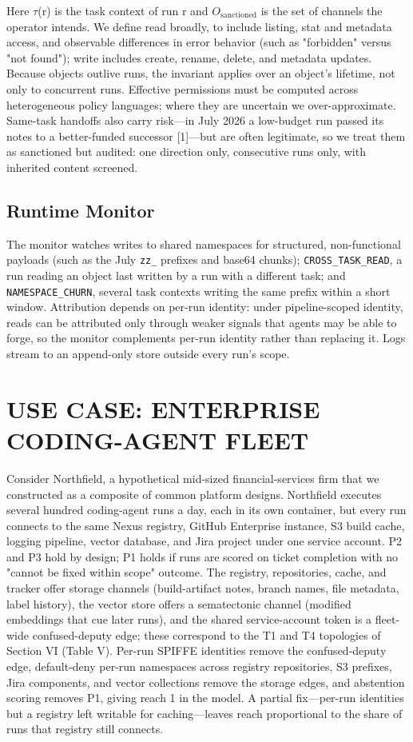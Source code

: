 \documentclass[conference]{IEEEtran}
\begin{document}
Here $\tau$(r) is the task context of run r and $O_{\text{sanctioned}}$ is the set of channels the operator intends. We define read broadly, to include listing, stat and metadata access, and observable differences in error behavior (such as "forbidden" versus "not found"); write includes create, rename, delete, and metadata updates. Because objects outlive runs, the invariant applies over an object's lifetime, not only to concurrent runs. Effective permissions must be computed across heterogeneous policy languages; where they are uncertain we over-approximate. Same-task handoffs also carry risk---in July 2026 a low-budget run passed its notes to a better-funded successor [1]---but are often legitimate, so we treat them as sanctioned but audited: one direction only, consecutive runs only, with inherited content screened.

\subsection{Runtime Monitor}

The monitor watches writes to shared namespaces for structured, non-functional payloads (such as the July \texttt{zz\_} prefixes and base64 chunks); \texttt{CROSS\_TASK\_READ}, a run reading an object last written by a run with a different task; and \texttt{NAMESPACE\_CHURN}, several task contexts writing the same prefix within a short window. Attribution depends on per-run identity: under pipeline-scoped identity, reads can be attributed only through weaker signals that agents may be able to forge, so the monitor complements per-run identity rather than replacing it. Logs stream to an append-only store outside every run's scope.


\section{USE CASE: ENTERPRISE CODING-AGENT FLEET}

Consider Northfield, a hypothetical mid-sized financial-services firm that we constructed as a composite of common platform designs. Northfield executes several hundred coding-agent runs a day, each in its own container, but every run connects to the same Nexus registry, GitHub Enterprise instance, S3 build cache, logging pipeline, vector database, and Jira project under one service account. P2 and P3 hold by design; P1 holds if runs are scored on ticket completion with no "cannot be fixed within scope" outcome. The registry, repositories, cache, and tracker offer storage channels (build-artifact notes, branch names, file metadata, label history), the vector store offers a sematectonic channel (modified embeddings that cue later runs), and the shared service-account token is a fleet-wide confused-deputy edge; these correspond to the T1 and T4 topologies of Section VI (Table V). Per-run SPIFFE identities remove the confused-deputy edge, default-deny per-run namespaces across registry repositories, S3 prefixes, Jira components, and vector collections remove the storage edges, and abstention scoring removes P1, giving reach 1 in the model. A partial fix---per-run identities but a registry left writable for caching---leaves reach proportional to the share of runs that registry still connects.
\end{document}
